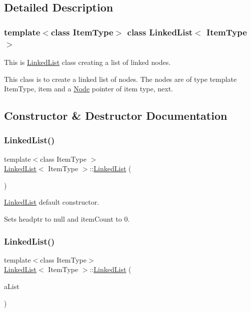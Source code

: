 \subsection{Detailed Description}
\subsubsection*{template$<$class Item\+Type$>$\newline
class Linked\+List$<$ Item\+Type $>$}

This is \hyperlink{classLinkedList}{Linked\+List} class creating a list of linked nodes. 

This class is to create a linked list of nodes. The nodes are of type template Item\+Type, item and a \hyperlink{classNode}{Node} pointer of item type, next. 

\subsection{Constructor \& Destructor Documentation}
\mbox{\label{classLinkedList_adf8d8164e06b6d358a36df7e53e814ee}} 
\subsubsection{\texorpdfstring{Linked\+List()}{LinkedList()}\hspace{0.1cm}{\footnotesize\ttfamily [1/2]}}
{\footnotesize\ttfamily template$<$class Item\+Type $>$ \\
\hyperlink{classLinkedList}{Linked\+List}$<$ Item\+Type $>$\+::\hyperlink{classLinkedList}{Linked\+List} (\begin{DoxyParamCaption}{ }\end{DoxyParamCaption})}



\hyperlink{classLinkedList}{Linked\+List} default constructor. 

Sets headptr to null and item\+Count to 0. \mbox{\label{classLinkedList_a6f1443c6120352f1f5b6bd3c0d95e41e}} 
\subsubsection{\texorpdfstring{Linked\+List()}{LinkedList()}\hspace{0.1cm}{\footnotesize\ttfamily [2/2]}}
{\footnotesize\ttfamily template$<$class Item\+Type$>$ \\
\hyperlink{classLinkedList}{Linked\+List}$<$ Item\+Type $>$\+::\hyperlink{classLinkedList}{Linked\+List} (\begin{DoxyParamCaption}\item[{const \hyperlink{classLinkedList}{Linked\+List}$<$ Item\+Type $>$ \&}]{a\+List }\end{DoxyParamCaption})}



